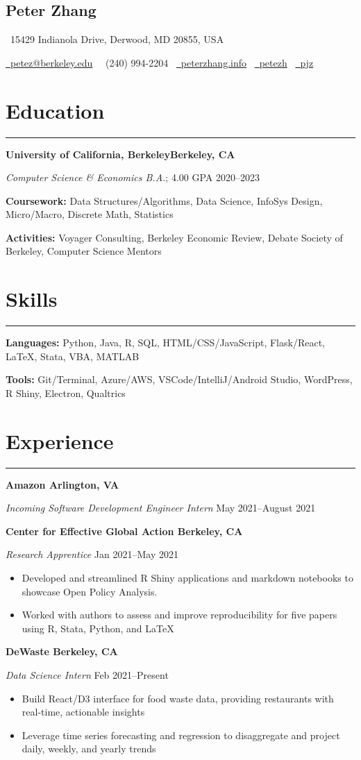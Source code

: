 \documentclass[11pt]{article}
\newcommand{\name}[1]{\begin{center}\section*{\huge \color{highlight} #1}\vspace{-0.5cm}\end{center}}
\newcommand{\topinfo}[1]{\begin{center}\vspace{-0.2cm}#1\vspace{-0.2cm}\end{center}}
\newcommand{\resumesection}[1]{\vspace{-0.6cm}\section*{\color{highlight}#1}\vspace{-0.3cm}\hrule\vspace{0.2cm}}
\begin{document}
\name{Peter Zhang}
\topinfo{\faHome \ 15429 Indianola Drive, Derwood, MD 20855, USA}
\topinfo{\href{mailto:petez@berkeley.edu}{\faEnvelope \ petez@berkeley.edu} \ \faPhone \ (240) 994-2204 \ \href{https://peterzhang.info/}{\faBriefcase \ peterzhang.info} \  \href{https://github.com/petezh}{\faGithub \ petezh} \  \href{https://www.linkedin.com/in/pjz/}{\faLinkedinSquare \ pjz}}

\resumesection{Education}

\textbf{University of California, Berkeley\hfill Berkeley, CA} \par
\textit{Computer Science \& Economics B.A.}; 4.00 GPA \hfill 2020--2023\par
\textbf{Coursework:} Data Structures/Algorithms, Data Science, InfoSys Design, Micro/Macro, Discrete Math, Statistics\par
\textbf{Activities:} Voyager Consulting, Berkeley Economic Review, Debate Society of Berkeley, Computer Science Mentors

\resumesection{Skills}

\textbf{Languages:} Python, Java, R, SQL, HTML/CSS/JavaScript, Flask/React, \LaTeX, Stata, VBA, MATLAB \par
\textbf{Tools:} Git/Terminal, Azure/AWS, VSCode/IntelliJ/Android Studio, WordPress, R Shiny, Electron, Qualtrics

\resumesection{Experience}

\textbf{Amazon \hfill Arlington, VA}\par

\textit{Incoming Software Development Engineer Intern} \hfill May 2021--August 2021

\textbf{Center for Effective Global Action \hfill Berkeley, CA}\par

\textit{Research Apprentice} \hfill Jan 2021--May 2021
\begin{itemize}
	\item Developed and streamlined R Shiny applications and markdown notebooks to showcase Open Policy Analysis.
	\item Worked with authors to assess and improve reproducibility for five papers using R, Stata, Python, and \LaTeX
\end{itemize}\par

\textbf{DeWaste \hfill Berkeley, CA}\par

\textit{Data Science Intern} \hfill Feb 2021--Present
\begin{itemize}
	\item Build React/D3 interface for food waste data, providing restaurants with real-time, actionable insights
	\item Leverage time series forecasting and regression to disaggregate and project daily, weekly, and yearly trends
\end{itemize}\par
\end{document}
